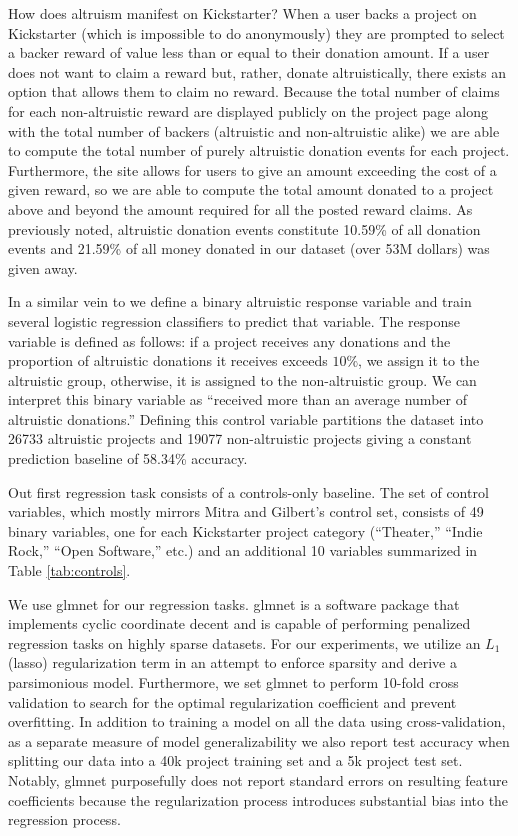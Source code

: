 \documentclass[letterpaper]{article}
\begin{document}
How does altruism manifest on Kickstarter? When a user backs a project on Kickstarter (which is impossible to do anonymously) they are prompted to select a backer reward of value less than or equal to their donation amount. If a user does not want to claim a reward but, rather, donate altruistically, there exists an option that allows them to claim no reward. Because the total number of claims for each non-altruistic reward are displayed publicly on the project page along with the total number of backers (altruistic and non-altruistic alike) we are able to compute the total number of purely altruistic donation events for each project. Furthermore, the site allows for users to give an amount exceeding the cost of a given reward, so we are able to compute the total amount donated to a project above and beyond the amount required for all the posted reward claims. As previously noted, altruistic donation events constitute 10.59\% of all donation events and 21.59\% of all money donated in our dataset (over 53M dollars) was given away.

In a similar vein to \cite{mitra2014language} we define a binary altruistic response variable and train several logistic regression classifiers to predict that variable. The response variable is defined as follows: if a project receives any donations and the proportion of altruistic donations it receives exceeds $10\%$, we assign it to the altruistic group, otherwise, it is assigned to the non-altruistic group. We can interpret this binary variable as ``received more than an average number of altruistic donations.'' Defining this control variable partitions the dataset into 26733 altruistic projects and 19077 non-altruistic projects giving a constant prediction baseline of 58.34\% accuracy.

Out first regression task consists of a controls-only baseline. The set of control variables, which mostly mirrors Mitra and Gilbert's control set, consists of 49 binary variables, one for each Kickstarter project category (``Theater,'' ``Indie Rock,'' ``Open Software,'' etc.) and an additional 10 variables summarized in Table \ref{tab:controls}.

We use glmnet \cite{friedman2010glmnet} for our regression tasks. glmnet is a software package that implements cyclic coordinate decent and is capable of performing penalized regression tasks on highly sparse datasets. For our experiments, we utilize an $L_1$ (lasso) regularization term in an attempt to enforce sparsity and derive a parsimonious model. Furthermore, we set glmnet to perform 10-fold cross validation to search for the optimal regularization coefficient and prevent overfitting. In addition to training a model on all the data using cross-validation, as a separate measure of model generalizability we also report test accuracy when splitting our data into a 40k project training set and a 5k project test set. Notably, glmnet purposefully does not report standard errors on resulting feature coefficients because the regularization process introduces substantial bias into the regression process.
\end{document}
